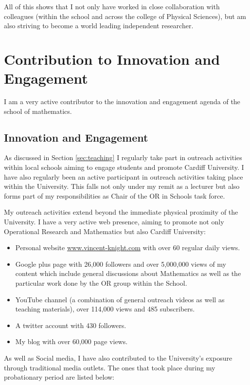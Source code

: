 \documentclass{article}
\begin{document}
All of this shows that I not only have worked in close collaboration with colleagues (within the school and across the college of Physical Sciences), but am also striving to become a world leading independent researcher.

\section{Contribution to Innovation and Engagement}\label{sec:innovation}

I am a very active contributor to the innovation and engagement agenda of the school of mathematics.

\subsection{Innovation and Engagement}

As discussed in Section \ref{sec:teaching} I regularly take part in outreach activities within local schools aiming to engage students and promote Cardiff University.
I have also regularly been an active participant in outreach activities taking place within the University.
This falls not only under my remit as a lecturer but also forms part of my responsibilities as Chair of the OR in Schools task force.

My outreach activities extend beyond the immediate physical proximity of the University. I have a very active web presence, aiming to promote not only Operational Research and Mathematics but also Cardiff University:

\begin{itemize}
    \item Personal website \url{www.vincent-knight.com} with over 60 regular daily views.
    \item Google plus page with 26,000 followers and over 5,000,000 views of my content which include general discussions about Mathematics as well as the particular work done by the OR group within the School.
    \item YouTube channel (a combination of general outreach videos as well as teaching materials), over 114,000 views and 485 subscribers.
    \item A twitter account with 430 followers.
    \item My blog with over 60,000 page views.
\end{itemize}

As well as Social media, I have also contributed to the University's exposure through traditional media outlets.
The ones that took place during my probationary period are listed below:
\end{document}

